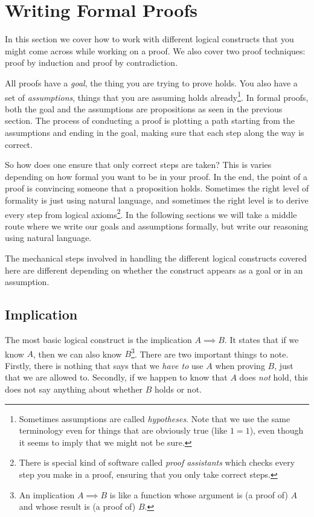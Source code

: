 \documentclass{tufte-handout}
\begin{document}
\section{Writing Formal Proofs}

In this section we cover how to work with different logical
constructs that you might come across while working on a proof. We
also cover two proof techniques: proof by induction and proof by
contradiction.

All proofs have a \emph{goal}, the thing you are trying to prove
holds. You also have a set of \emph{assumptions}, things that you
are assuming holds already\footnote{Sometimes assumptions are
  called \emph{hypotheses}. Note that we use the same terminology
  even for things that are obviously true (like $1=1$), even
  though it seems to imply that we might not be sure.}. In formal
proofs, both the goal and the assumptions are propositions as seen
in the previous section. The process of conducting a proof is
plotting a path starting from the assumptions and ending in the
goal, making sure that each step along the way is correct.

So how does one ensure that only correct steps are taken? This is
varies depending on how formal you want to be in your proof. In
the end, the point of a proof is convincing someone that a
proposition holds. Sometimes the right level of formality is just
using natural language, and sometimes the right level is to derive
every step from logical axioms\footnote{There is special kind of
  software called \emph{proof assistants} which checks every step
  you make in a proof, ensuring that you only take correct
  steps.}.
%
In the following sections we will take a middle route where we
write our goals and assumptions formally, but write our reasoning
using natural language.

The mechanical steps involved in handling the different logical
constructs covered here are different depending on whether the
construct appears as a goal or in an assumption.


\subsection{Implication}

The most basic logical construct is the implication
$A \implies B$. It states that if we know $A$, then we can also
know $B$\footnote{An implication $A \implies B$ is like a function
  whose argument is (a proof of) $A$ and whose result is (a proof
  of) $B$.}. There are two important things to note. Firstly,
there is nothing that says that we \emph{have to} use $A$ when
proving $B$, just that we are allowed to. Secondly, if we happen
to know that $A$ does \emph{not} hold, this does not say anything
about whether $B$ holds or not.
\end{document}
